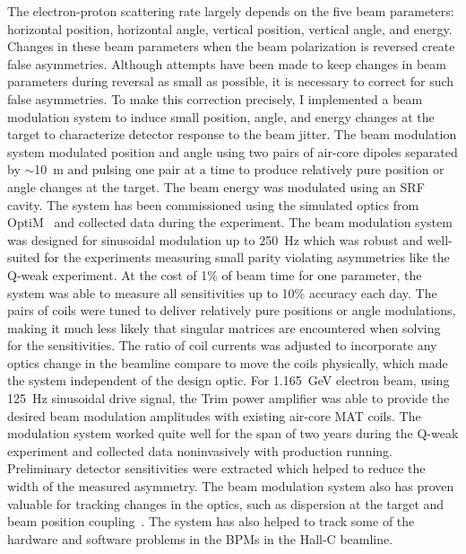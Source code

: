 The electron-proton scattering rate largely depends on the five beam parameters: horizontal position, horizontal angle, vertical position, vertical angle, and energy. Changes in these beam parameters when the beam polarization is reversed create false asymmetries. 
Although attempts have been made to keep changes in beam parameters during reversal as small as possible, it is necessary to correct for such false asymmetries. 
To make this correction precisely, I implemented a beam modulation system to induce small position, angle, and energy changes at the target to characterize detector response to the beam jitter. 
The beam modulation system modulated position and angle using two pairs of air-core dipoles separated by $\sim$10~m and pulsing one pair at a time to produce relatively pure position or angle changes at the target. The beam energy was modulated using an SRF cavity.
The system has been commissioned using the simulated optics from OptiM~\cite{OPTIM} and collected data during the experiment. 
%
The beam modulation system was designed for sinusoidal modulation up to 250~Hz which was robust and well-suited for the experiments measuring small parity violating asymmetries like the Q-weak experiment. 
At the cost of 1\% of beam time for one parameter, the system was able to measure all sensitivities up to 10\% accuracy each day. The pairs of coils were tuned to deliver relatively pure positions or angle modulations, making it much less likely that singular matrices are encountered when solving for the sensitivities. 
%
The ratio of coil currents was adjusted to incorporate any optics change in the beamline compare to move the coils physically, which made the system independent of the design optic. For 1.165~GeV electron beam, using 125~Hz sinusoidal drive signal, the Trim power amplifier was able to provide the desired beam modulation amplitudes with existing air-core MAT coils. 
The modulation system worked quite well for the span of two years during the Q-weak experiment and collected data noninvasively with production running. 
%
Preliminary detector sensitivities were extracted which helped to reduce the width of the measured asymmetry. The beam modulation system also has proven valuable for tracking changes in the optics, such as dispersion at the target and beam position coupling~\cite{nurBModCIPANP2012}.
%
The system has also helped to track some of the hardware and software problems in the BPMs in the Hall-C beamline. 
%


